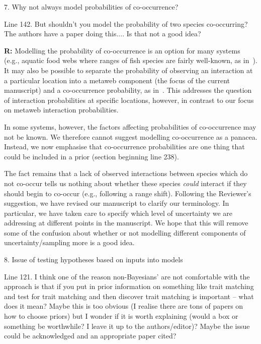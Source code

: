 \documentclass[12pt]{letter}
\newenvironment{refquote}{\bigskip \begin{it}}{\end{it}\smallskip}
\begin{document}
	7. Why not always model probabilities of co-occurrence?


		\begin{refquote}
		Line 142.  But shouldn't you model the probability of two species co-occurring?  The authors have a paper doing this.... Is that not a good idea?
		\end{refquote}


		\textbf{R:} Modelling the probability of co-occurrence is an option for many systems (e.g., aquatic food webs where ranges of fish species are fairly well-known, as in~\citet{Gravel2013}). It may also be possible to separate the probability of observing an interaction at a particular location into a metaweb component (the focus of the current manuscript) and a co-occurrence probability, as in~\citep{Gravel2018}. This addresses the question of interaction probabilities at specific locations, however, in contrast to our focus on metaweb interaction probabilities.


		In some systems, however, the factors affecting probabilities of co-occurrence may not be known. We therefore cannot suggest modelling co-occurrence as a panacea. Instead, we now emphasise that co-occurrence probabilities are one thing that could be included in a prior (section beginning line 238). 


		The fact remains that a lack of observed interactions between species which do not co-occur tells us nothing about whether these species \emph{could} interact if they should begin to co-occur (e.g., following a range shift). Following the Reviewer's suggestion, we have revised our manuscript to clarify our terminology. In particular, we have taken care to specify which level of uncertainty we are addressing at different points in the manuscript. We hope that this will remove some of the confusion about whether or not modelling different components of uncertainty/sampling more is a good idea. 


	8. Issue of testing hypotheses based on inputs into models 


		\begin{refquote}
		Line 121.  I think one of the reason non-Bayesians' are not comfortable with the approach is that if you put in prior information on something like trait matching and test for trait matching and then discover trait matching is important – what does it mean?  Maybe this is too obvious (I realise there are tons of papers on how to choose priors) but I wonder if it is worth explaining (would a box or something be worthwhile?  I leave it up to the authors/editor)?  Maybe the issue could be acknowledged and an appropriate paper cited?
		\end{refquote}
\end{document}
